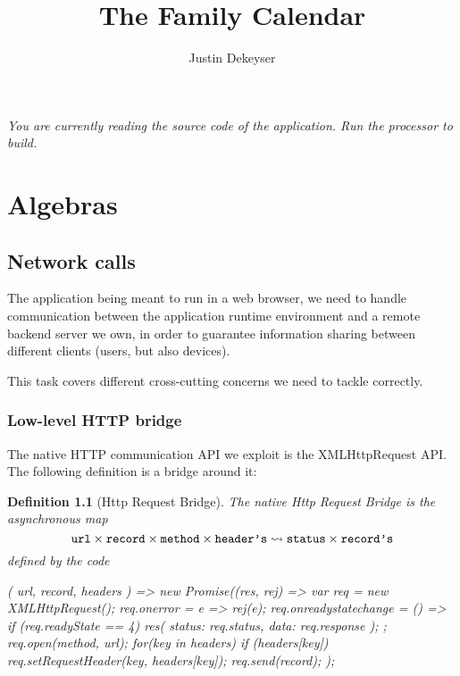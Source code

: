\documentclass[12pt,a4paper]{report}
\author{Justin Dekeyser}
\title{The Family Calendar}
\newtheorem{definition}{Definition}
\begin{document}
\maketitle

\begin{flushright}\it
You are currently reading the source code of the application.\linebreak
Run the processor to build.
\end{flushright}

\chapter{Algebras}

\section{Network calls}

The application being meant to run in a web browser, we need to handle
communication between the application runtime environment and a remote backend
server we own, in order to guarantee information sharing between different
clients (users, but also devices).

This task covers different cross-cutting concerns we need to tackle
correctly.

\subsection{Low-level HTTP bridge}

The native HTTP communication API we exploit is the XMLHttpRequest
API. The following definition is a bridge around it:

\begin{definition}[Http Request Bridge]\label{http_request_bridge}
The native Http Request Bridge is the asynchronous map
	\[
	{
	  \texttt{url}\times\texttt{record}\times\texttt{method}\times{{\texttt{header}}\texttt{'s}}
	}\rightsquigarrow{
	  \texttt{status}\times{{\texttt{record}}\texttt{'s}}
	} \]
defined by the code
\begin{code}
({ url, record, headers }) => new Promise((res, rej) => {
  var req = new XMLHttpRequest();
  req.onerror = e => rej(e);
  req.onreadystatechange = () => {
    if (req.readyState == 4)
      res({ status: req.status, data: req.response });
  };
  req.open(method, url);
  for(key in headers) if (headers[key])
    req.setRequestHeader(key, headers[key]);
  req.send(record);
});
\end{code}
\end{definition}
\end{document}
